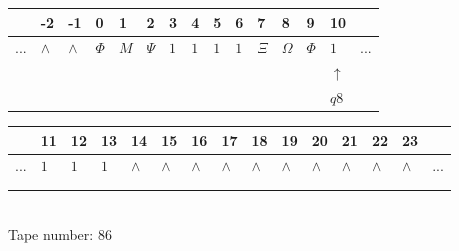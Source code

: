\documentclass[11pt]{article}
\begin{document}
\begin{table}[H]
\centering
\begin{tabular}{lllllllllllllll}
 & -2 & -1 & 0 & 1 & 2 & 3 & 4 & 5 & 6 & 7 & 8 & 9 & 10 & \\
\hline
$...$ & \multicolumn{1}{|l|}{$\wedge$} & \multicolumn{1}{|l|}{$\wedge$} & \multicolumn{1}{|l|}{$\Phi$} & \multicolumn{1}{|l|}{$M$} & \multicolumn{1}{|l|}{$\Psi$} & \multicolumn{1}{|l|}{$1$} & \multicolumn{1}{|l|}{$1$} & \multicolumn{1}{|l|}{$1$} & \multicolumn{1}{|l|}{$1$} & \multicolumn{1}{|l|}{$\Xi$} & \multicolumn{1}{|l|}{$\Omega$} & \multicolumn{1}{|l|}{$\Phi$} & \multicolumn{1}{|l|}{$1$} & $...$\\
\hline
&  &  &  &  &  &  &  &  &  &  &  &  & $\uparrow$ &  \\
&  &  &  &  &  &  &  &  &  &  &  &  & $ q8 $ &  \\
\end{tabular}
\begin{tabular}{lllllllllllllll}
 & 11 & 12 & 13 & 14 & 15 & 16 & 17 & 18 & 19 & 20 & 21 & 22 & 23 & \\
\hline
$...$ & \multicolumn{1}{|l|}{$1$} & \multicolumn{1}{|l|}{$1$} & \multicolumn{1}{|l|}{$1$} & \multicolumn{1}{|l|}{$\wedge$} & \multicolumn{1}{|l|}{$\wedge$} & \multicolumn{1}{|l|}{$\wedge$} & \multicolumn{1}{|l|}{$\wedge$} & \multicolumn{1}{|l|}{$\wedge$} & \multicolumn{1}{|l|}{$\wedge$} & \multicolumn{1}{|l|}{$\wedge$} & \multicolumn{1}{|l|}{$\wedge$} & \multicolumn{1}{|l|}{$\wedge$} & \multicolumn{1}{|l|}{$\wedge$} & $...$\\
\hline
&  &  &  &  &  &  &  &  &  &  &  &  &  &  \\
&  &  &  &  &  &  &  &  &  &  &  &  &  &  \\
\end{tabular}
\\
Tape number: 86
\noindent\makebox[\linewidth]{\hdashrule{\textwidth}{1pt}{1pt}}\end{table}
\end{document}
